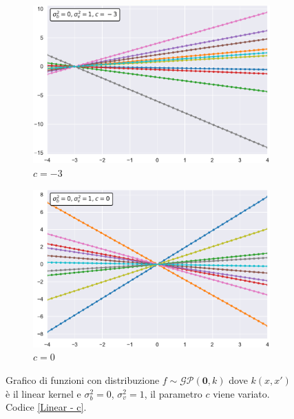 \begin{figure}[h]
\centering
\begin{subfigure}{.5\textwidth}
  \centering
  \includegraphics[width=\linewidth]{images/Gaussian process/Linear - c=-3.pdf}
  \caption{$c=-3$}
\end{subfigure}%
\begin{subfigure}{.5\textwidth}
  \centering
  \includegraphics[width=\linewidth]{images/Gaussian process/Linear - c=0.pdf}
  \caption{$c=0$}
\end{subfigure}
\caption{Grafico di funzioni con distribuzione $f\sim \mathcal{GP}(\bm{0},k)$ dove $k(x,x')$ è il linear kernel e $\sigma_b^2=0$, $\sigma_v^2=1$, il parametro $c$ viene variato. Codice \ref{Linear - c}.}
\label{10 sample linear modified c}
\end{figure}



